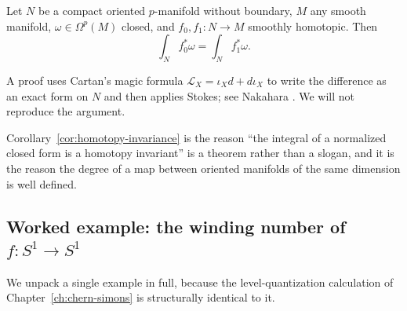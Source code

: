 \begin{corollary}\label{cor:homotopy-invariance}
Let $N$ be a compact oriented $p$-manifold without boundary, $M$ any smooth manifold, $\omega \in \Omega^p(M)$ closed, and $f_0, f_1 : N \to M$ smoothly homotopic. Then
\begin{equation*}
\int_N f_0^* \omega = \int_N f_1^* \omega.
\end{equation*}
\end{corollary}

A proof uses Cartan's magic formula $\mathcal{L}_X = \iota_X d + d\iota_X$ to write the difference as an exact form on $N$ and then applies Stokes; see Nakahara \cite{Nakahara2003GTP}. We will not reproduce the argument.

\medskip

\noindent Corollary~\ref{cor:homotopy-invariance} is the reason ``the integral of a normalized closed form is a homotopy invariant'' is a theorem rather than a slogan, and it is the reason the degree of a map between oriented manifolds of the same dimension is well defined.

\subsection{Worked example: the winding number of $f : S^1 \to S^1$}

We unpack a single example in full, because the level-quantization calculation of Chapter~\ref{ch:chern-simons} is structurally identical to it.

